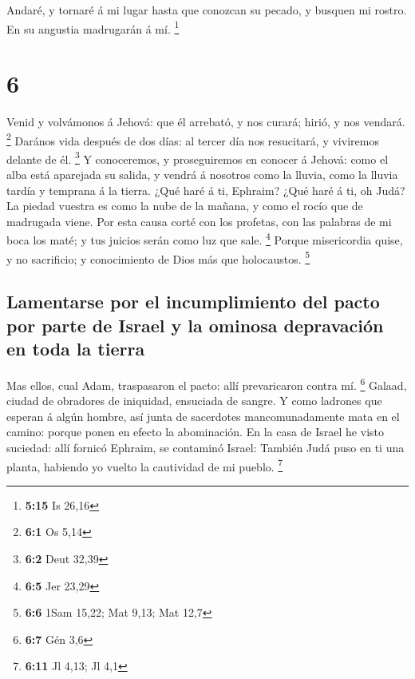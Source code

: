  Andaré, y tornaré á mi lugar hasta que conozcan su pecado,
y busquen mi rostro. En su angustia madrugarán á mí. \footnote{\textbf{5:15}
  Is 26,16}

\hypertarget{section-5}{%
\section{6}\label{section-5}}

 Venid y volvámonos á Jehová: que él arrebató, y nos curará;
hirió, y nos vendará. \footnote{\textbf{6:1} Os 5,14} 
Darános vida después de dos días: al tercer día nos resucitará, y
viviremos delante de él. \footnote{\textbf{6:2} Deut 32,39} 
Y conoceremos, y proseguiremos en conocer á Jehová: como el alba está
aparejada su salida, y vendrá á nosotros como la lluvia, como la lluvia
tardía y temprana á la tierra.  ¿Qué haré á ti, Ephraim?
¿Qué haré á ti, oh Judá? La piedad vuestra es como la nube de la mañana,
y como el rocío que de madrugada viene.  Por esta causa
corté con los profetas, con las palabras de mi boca los maté; y tus
juicios serán como luz que sale. \footnote{\textbf{6:5} Jer 23,29}
 Porque misericordia quise, y no sacrificio; y conocimiento
de Dios más que holocaustos. \footnote{\textbf{6:6} 1Sam 15,22; Mat
  9,13; Mat 12,7}

\hypertarget{lamentarse-por-el-incumplimiento-del-pacto-por-parte-de-israel-y-la-ominosa-depravaciuxf3n-en-toda-la-tierra}{%
\subsection{Lamentarse por el incumplimiento del pacto por parte de
Israel y la ominosa depravación en toda la
tierra}\label{lamentarse-por-el-incumplimiento-del-pacto-por-parte-de-israel-y-la-ominosa-depravaciuxf3n-en-toda-la-tierra}}

 Mas ellos, cual Adam, traspasaron el pacto: allí
prevaricaron contra mí. \footnote{\textbf{6:7} Gén 3,6} 
Galaad, ciudad de obradores de iniquidad, ensuciada de sangre.
 Y como ladrones que esperan á algún hombre, así junta de
sacerdotes mancomunadamente mata en el camino: porque ponen en efecto la
abominación.  En la casa de Israel he visto suciedad: allí
fornicó Ephraim, se contaminó Israel:  También Judá puso en
ti una planta, habiendo yo vuelto la cautividad de mi pueblo.
\footnote{\textbf{6:11} Jl 4,13; Jl 4,1}

